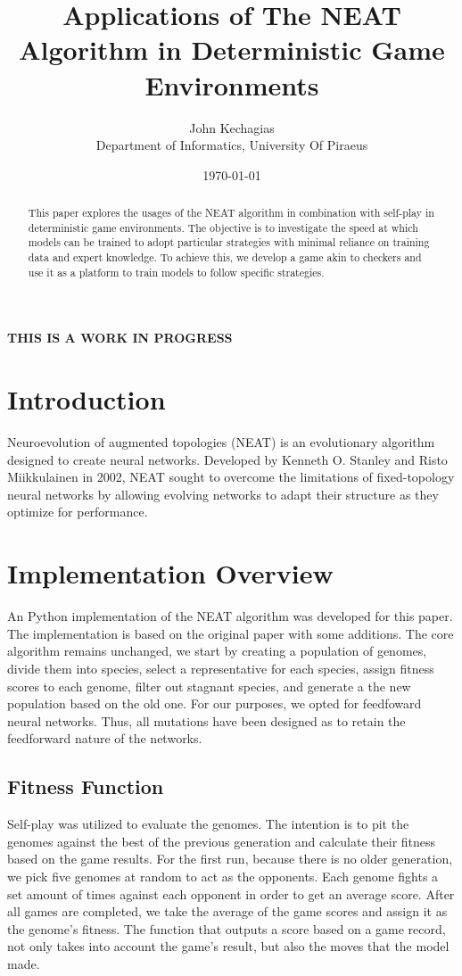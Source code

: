 \documentclass[letterpaper, 12pt]{article}
\title{Applications of The NEAT Algorithm in Deterministic Game Environments}
\date{\today}
\author{John Kechagias\\ Department of Informatics, University Of Piraeus}
\begin{document}
\maketitle

\centerline{\textbf{THIS IS A WORK IN PROGRESS}}

\begin{abstract}
This paper explores the usages of the NEAT algorithm in combination with self-play in
deterministic game environments. The objective is to investigate the speed at which
models can be trained to adopt particular strategies with minimal reliance on training
data and expert knowledge. To achieve this, we develop a game akin to checkers and use
it as a platform to train models to follow specific strategies.
\end{abstract}

\section*{Introduction}

Neuroevolution of augmented topologies (NEAT) \cite{stanley:ec02} is an evolutionary 
algorithm designed to create neural networks. Developed by Kenneth O. Stanley and Risto
Miikkulainen in 2002, NEAT sought to overcome the limitations of fixed-topology neural
networks by allowing evolving networks to adapt their structure as they optimize
for performance.

\section*{Implementation Overview}

An Python implementation of the NEAT algorithm was developed for this paper. The
implementation is based on the original paper \cite{stanley:ec02} with some additions.
The core algorithm remains unchanged, we start by creating a population of genomes,
divide them into species, select a representative for each species, assign fitness
scores to each genome, filter out stagnant species, and generate a the new population
based on the old one. For our purposes, we opted for feedfoward neural networks. Thus,
all mutations have been designed as to retain the feedforward nature of the networks.

\subsection*{Fitness Function}

Self-play was utilized to evaluate the genomes. The intention is to pit the genomes
against the best of the previous generation and calculate their fitness based on the
game results. For the first run, because there is no older generation, we pick five
genomes at random to act as the opponents. Each genome fights a set amount of times
against each opponent in order to get an average score. After all games are completed,
we take the average of the game scores and assign it as the genome's fitness. The
function that outputs a score based on a game record, not only takes into account the
game's result, but also the moves that the model made.
\end{document}
